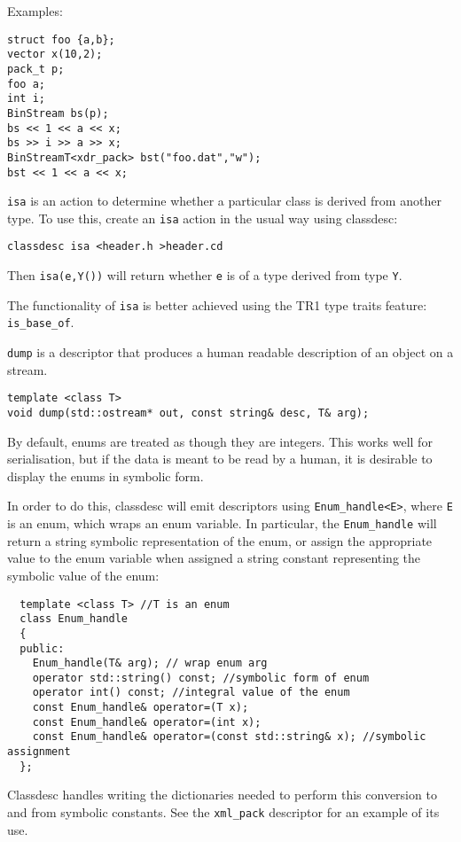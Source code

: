 Examples:
\begin{verbatim}
struct foo {a,b};
vector x(10,2);
pack_t p;
foo a; 
int i;
BinStream bs(p);
bs << 1 << a << x;
bs >> i >> a >> x;
BinStreamT<xdr_pack> bst("foo.dat","w");
bst << 1 << a << x;
\end{verbatim}

\verb+isa+ is an action to determine whether a particular class is
derived from another type. To use this, create an \verb+isa+ action in
the usual way using classdesc:
\begin{verbatim}
classdesc isa <header.h >header.cd
\end{verbatim}
Then \verb+isa(e,Y())+ will return whether \verb+e+ is of a type
derived from type \verb+Y+.

The functionality of \verb+isa+ is better achieved using the TR1 type
traits feature: \verb+is_base_of+.


\verb+dump+ is a descriptor that produces a human readable description of
an object on a stream.
\begin{verbatim}
template <class T>
void dump(std::ostream* out, const string& desc, T& arg); 
\end{verbatim}

\label{symbolic enums}

By default, enums are treated as though they are integers. This works
well for serialisation, but if the data is meant to be read by a
human, it is desirable to display the enums in symbolic form.

In order to do this, classdesc will emit descriptors using
\verb+Enum_handle<E>+, where \verb+E+ is an enum, which wraps an enum
variable. In particular, the \verb+Enum_handle+ will return a string
symbolic representation of the enum, or assign the appropriate value
to the enum variable when assigned a string constant representing the
symbolic value of the enum:
\begin{verbatim}
  template <class T> //T is an enum
  class Enum_handle
  {
  public:
    Enum_handle(T& arg); // wrap enum arg
    operator std::string() const; //symbolic form of enum
    operator int() const; //integral value of the enum
    const Enum_handle& operator=(T x);
    const Enum_handle& operator=(int x);
    const Enum_handle& operator=(const std::string& x); //symbolic assignment  
  };
\end{verbatim}
Classdesc handles writing the dictionaries needed to perform this
conversion to and from symbolic constants. See the \verb+xml_pack+
descriptor for an example of its use.

